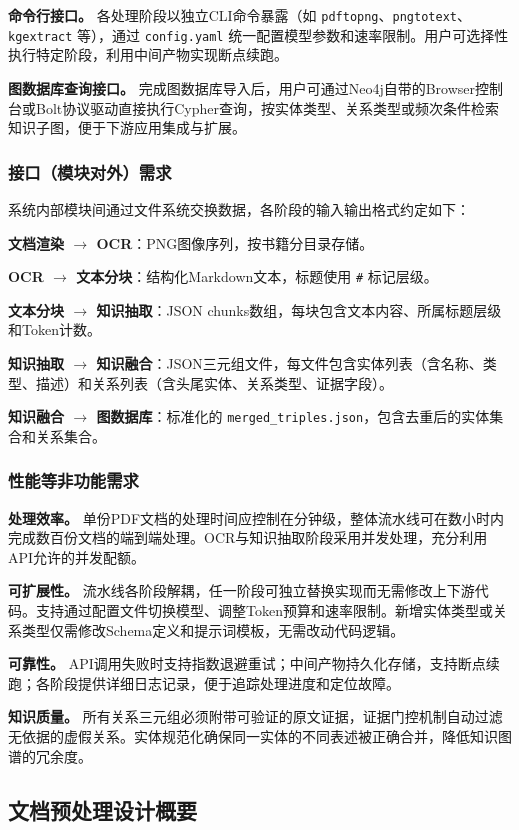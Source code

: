 \textbf{命令行接口。} 各处理阶段以独立CLI命令暴露（如 \texttt{pdftopng}、\texttt{pngtotext}、\texttt{kgextract} 等），通过 \texttt{config.yaml} 统一配置模型参数和速率限制。用户可选择性执行特定阶段，利用中间产物实现断点续跑。

\textbf{图数据库查询接口。} 完成图数据库导入后，用户可通过Neo4j自带的Browser控制台或Bolt协议驱动直接执行Cypher查询，按实体类型、关系类型或频次条件检索知识子图，便于下游应用集成与扩展。

\subsubsection{接口（模块对外）需求}

系统内部模块间通过文件系统交换数据，各阶段的输入输出格式约定如下：

\textbf{文档渲染 $\to$ OCR}：PNG图像序列，按书籍分目录存储。

\textbf{OCR $\to$ 文本分块}：结构化Markdown文本，标题使用 \texttt{\#} 标记层级。

\textbf{文本分块 $\to$ 知识抽取}：JSON chunks数组，每块包含文本内容、所属标题层级和Token计数。

\textbf{知识抽取 $\to$ 知识融合}：JSON三元组文件，每文件包含实体列表（含名称、类型、描述）和关系列表（含头尾实体、关系类型、证据字段）。

\textbf{知识融合 $\to$ 图数据库}：标准化的 \texttt{merged\_triples.json}，包含去重后的实体集合和关系集合。

\subsubsection{性能等非功能需求}

\textbf{处理效率。} 单份PDF文档的处理时间应控制在分钟级，整体流水线可在数小时内完成数百份文档的端到端处理。OCR与知识抽取阶段采用并发处理，充分利用API允许的并发配额。

\textbf{可扩展性。} 流水线各阶段解耦，任一阶段可独立替换实现而无需修改上下游代码。支持通过配置文件切换模型、调整Token预算和速率限制。新增实体类型或关系类型仅需修改Schema定义和提示词模板，无需改动代码逻辑。

\textbf{可靠性。} API调用失败时支持指数退避重试；中间产物持久化存储，支持断点续跑；各阶段提供详细日志记录，便于追踪处理进度和定位故障。

\textbf{知识质量。} 所有关系三元组必须附带可验证的原文证据，证据门控机制自动过滤无依据的虚假关系。实体规范化确保同一实体的不同表述被正确合并，降低知识图谱的冗余度。

\subsection{文档预处理设计概要}

